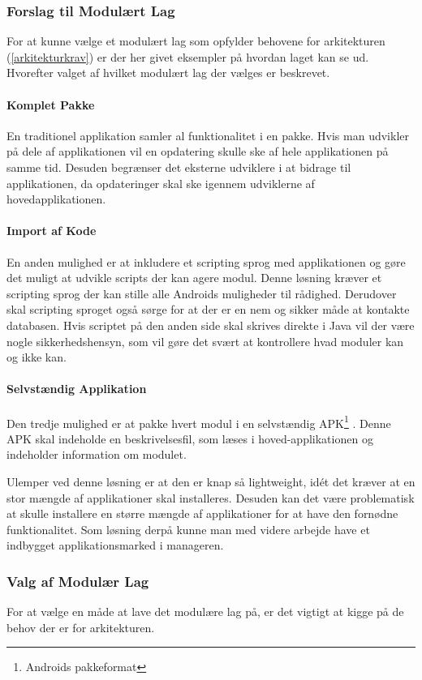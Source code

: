 \subsubsection{Forslag til Modulært Lag}
For at kunne vælge et modulært lag som opfylder behovene for arkitekturen (\cref{arkitekturkrav}) er der her givet eksempler på hvordan laget kan se ud.
Hvorefter valget af hvilket modulært lag der vælges er beskrevet.

\paragraph{Komplet Pakke}
En traditionel applikation samler al funktionalitet i en pakke.
Hvis man udvikler på dele af applikationen vil en opdatering skulle ske af hele applikationen på samme tid.
Desuden begrænser det eksterne udviklere i at bidrage til applikationen, da opdateringer skal ske igennem udviklerne af hovedapplikationen.

\paragraph{Import af Kode}
En anden mulighed er at inkludere et scripting sprog med applikationen og gøre det muligt at udvikle scripts der kan agere modul.
Denne løsning kræver et scripting sprog der kan  stille alle Androids muligheder til rådighed.
Derudover skal scripting sproget også sørge for at der er en nem og sikker måde at kontakte databasen.
Hvis scriptet på den anden side skal skrives direkte i Java vil der være nogle sikkerhedshensyn, som vil gøre det svært at kontrollere hvad moduler kan og ikke kan.

\paragraph{Selvstændig Applikation}
Den tredje mulighed er at pakke hvert modul i en selvstændig APK\footnote{Androids pakkeformat} \citep{misc:apk}.
Denne APK skal indeholde en beskrivelsesfil, som læses i hoved-applikationen og indeholder information om modulet.

Ulemper ved denne løsning er at den er knap så lightweight, idét det kræver at en stor mængde af applikationer skal installeres.
Desuden kan det være problematisk at skulle installere en større mængde af applikationer for at have den fornødne funktionalitet.
Som løsning derpå kunne man med videre arbejde have et indbygget applikationsmarked i manageren.

\subsubsection{Valg af Modulær Lag}
For at vælge en måde at lave det modulære lag på, er det vigtigt at kigge på de behov der er for arkitekturen.

